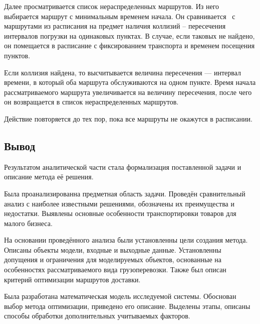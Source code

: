 	Далее просматривается список нераспределенных маршрутов. Из него \, выбирается маршрут с минимальным временем начала. Он сравнивается \, с \, маршрутами из расписания на предмет наличия коллизий -- пересечения интервалов погрузки на одинаковых пунктах. В случае, если таковых не найдено, он помещается в расписание с фиксированием транспорта и временем посещения пунктов. 
	
	Если коллизия найдена, то высчитывается величина пересечения --- интервал времени, в который оба маршрута обслуживаются на одном пункте. Время начала рассматриваемого маршрута увеличивается на величину пересечения, после чего он возвращается в список нераспределенных маршрутов. 
	
	Действие повторяется до тех пор, пока все маршруты не окажутся в расписании.

\subsection*{Вывод}
Результатом аналитической части стала формализация поставленной задачи и описание метода её решения.

Была проанализированна предметная область задачи. Проведён сравнительный анализ с наиболее известными решениями, обозначены их преимущества и недостатки. Выявлены основные особенности транспортировки товаров для малого бизнеса.

На основании проведённого анализа были установленны цели создания метода. Описаны объекты модели, входные и выходные данные. Установленны допущения и ограничения для моделируемых объектов, основанные на особенностях рассматриваемого вида грузоперевозки. Также был описан критерий оптимизации маршрутов доставки.

Была разработана математическая модель исследуемой системы. Обоснован выбор метода оптимизации, приведено его описание. Выделены этапы, описаны способы обработки дополнительных учитываемых факторов.

\pagebreak